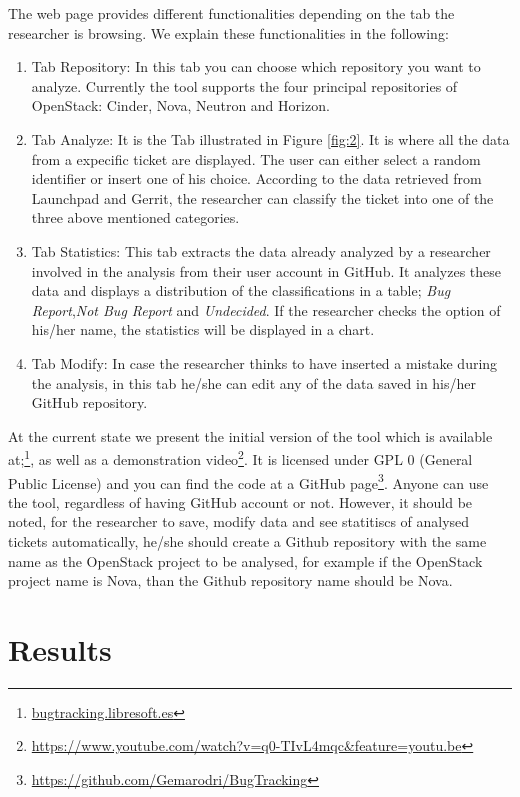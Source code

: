 \documentclass[runningheads,a4paper]{llncs}
\begin{document}
The web page provides different functionalities depending on the tab the researcher is browsing. We explain these functionalities in the following:
\begin{enumerate}
  \item Tab Repository: In this tab you can choose which repository you want to analyze. Currently the tool supports the four principal repositories of OpenStack: Cinder, Nova, Neutron and Horizon.
  \item Tab Analyze: It is the Tab illustrated in Figure \ref{fig:2}. It is where all the data from a expecific ticket are displayed. The user can either select a random identifier or insert one of his choice. According to the data retrieved from Launchpad and Gerrit, the researcher can classify the ticket into one of the three above mentioned categories.
  \item Tab Statistics: This tab extracts the data already analyzed by a researcher involved in the analysis from their user account in GitHub. It analyzes these data and displays a distribution of the classifications in a table; \textit{Bug Report},\textit{Not Bug Report} and \textit{Undecided}. If the researcher checks the option of his/her name, the statistics will be displayed in a chart.
  \item Tab Modify: In case the researcher thinks to have inserted a mistake during the analysis, in this tab he/she can edit any of the data saved in his/her GitHub repository. 
\end{enumerate}

At the current state we present the initial version of the tool which is available at;\footnote{\url{bugtracking.libresoft.es}}, as well as a demonstration video\footnote{\url{https://www.youtube.com/watch?v=q0-TIvL4mqc&feature=youtu.be}}. It is licensed under GPL 0 (General Public License) and you can find the code at a GitHub page\footnote{\url{https://github.com/Gemarodri/BugTracking}}. Anyone can use the tool, regardless of having GitHub account or not. However, it should be noted, for the researcher to save, modify data and see statitiscs of analysed tickets automatically, he/she should create a Github repository with the same name as the OpenStack project to be analysed, for example if the OpenStack project name is Nova, than the Github repository name should be Nova. 

\section{Results}
\label{sec:4}
\end{document}

